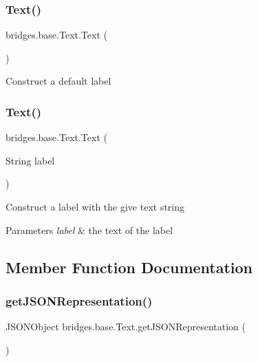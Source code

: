 \subsubsection{\texorpdfstring{Text()}{Text()}\hspace{0.1cm}{\footnotesize\ttfamily [1/2]}}
{\footnotesize\ttfamily bridges.\+base.\+Text.\+Text (\begin{DoxyParamCaption}{ }\end{DoxyParamCaption})}

Construct a default label \mbox{\label{classbridges_1_1base_1_1_text_a1df275662a047535686286e025034217}} 
\subsubsection{\texorpdfstring{Text()}{Text()}\hspace{0.1cm}{\footnotesize\ttfamily [2/2]}}
{\footnotesize\ttfamily bridges.\+base.\+Text.\+Text (\begin{DoxyParamCaption}\item[{String}]{label }\end{DoxyParamCaption})}

Construct a label with the give text string 
\begin{DoxyParams}{Parameters}
{\em label} & the text of the label \\
\hline
\end{DoxyParams}


\subsection{Member Function Documentation}
\mbox{\label{classbridges_1_1base_1_1_text_a463507cf8a25a600a213ca0ff849a568}} 
\subsubsection{\texorpdfstring{get\+J\+S\+O\+N\+Representation()}{getJSONRepresentation()}}
{\footnotesize\ttfamily J\+S\+O\+N\+Object bridges.\+base.\+Text.\+get\+J\+S\+O\+N\+Representation (\begin{DoxyParamCaption}{ }\end{DoxyParamCaption})}


